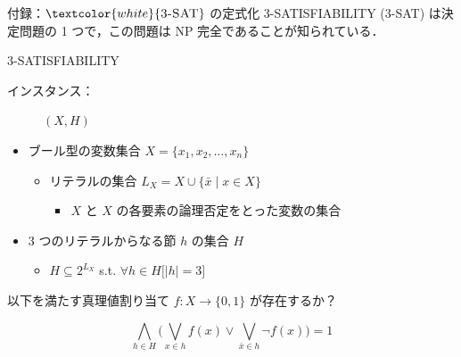 \documentclass[dvipdfmx]{beamer}
\begin{document}
    \begin{frame}{付録：${\textcolor{white}{\mbox {\sc 3-SAT}}}$ の定式化}
      \textsc{3-SATISFIABILITY (3-SAT) } は決定問題の 1 つで，この問題は NP 完全であることが知られている．
      \begin{block}{\textsc{3-SATISFIABILITY}}
        \begin{description}
          \item[インスタンス：] $(X,H)$
          \vspace{-2mm}
        \end{description}
        \begin{itemize}
          \item ブール型の変数集合 $X=\{x_1,x_2,\dots ,x_n\}$
          \begin{itemize}
            \item リテラルの集合 $L_X = X \cup \{\bar x \mid x \in X\}$
            \begin{itemize}
              \item $X$ と $X$ の各要素の論理否定をとった変数の集合
            \end{itemize}
          \end{itemize}
          \item 3 つのリテラルからなる節 $h$ の集合 $H$
          \begin{itemize}
            \item $H \subseteq 2^{L_X}$ s.t. $\forall h \in H \big[|h| = 3\big]$
          \end{itemize}
        \end{itemize}
        \begin{description}
          \setlength{\leftskip}{-8mm}
          \item[問題：] 以下を満たす真理値割り当て $f : X \to \{0,1\}$ が存在するか？
        \end{description}
        \vspace{-1mm}
        $$\displaystyle \bigwedge_{h \in H} \bigg(\bigvee_{x \in h}f(x) \lor \bigvee_{\bar x \in h}\lnot f(x) \bigg) = 1$$
        \vspace{-1mm}
      \end{block}
    \end{frame}
\end{document}
